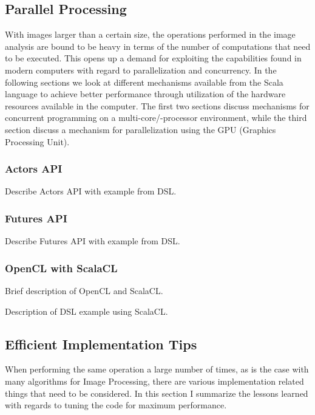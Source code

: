 \documentclass[a4paper,english]{report}
\begin{document}
\subsection{Parallel Processing}

With images larger than a certain size, the operations performed in
the image analysis are bound to be heavy in terms of the number of
computations that need to be executed. This opens up a demand for
exploiting the capabilities found in modern computers with regard to
parallelization and concurrency. In the following sections we look at
different mechanisms available from the Scala language to achieve
better performance through utilization of the hardware resources
available in the computer. The first two sections discuss mechanisms
for concurrent programming on a multi-core/-processor environment,
while the third section discuss a mechanism for parallelization using
the GPU (Graphics Processing Unit).

\subsubsection{Actors API}
\label{sec:actors}

Describe Actors API with example from DSL.

\subsubsection{Futures API}
\label{sec:futures}

Describe Futures API with example from DSL.

\subsubsection{OpenCL with ScalaCL}
\label{sec:opencl}

Brief description of OpenCL\cite{opencl} and ScalaCL\cite{scalacl}.

Description of DSL example using ScalaCL.

\subsection{Efficient Implementation Tips}
\label{sec:effimpl}

When performing the same operation a large number of times, as is the
case with many algorithms for Image Processing, there are various
implementation related things that need to be considered. In this
section I summarize the lessons learned with regards to tuning the
code for maximum performance.
\end{document}
